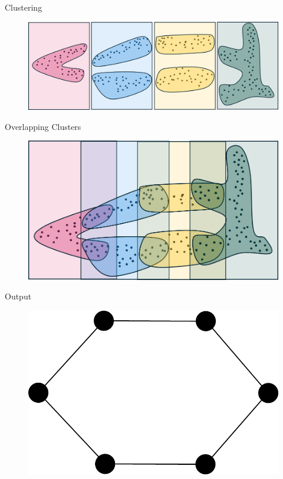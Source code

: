\documentclass{beamer}
\begin{document}
\begin{frame}{Clustering}
  \begin{figure}
    \begin{center}
      \includegraphics[width=1\textwidth]{posterdataclusters.png}
    \end{center}
  \end{figure}
\end{frame}

\begin{frame}{Overlapping Clusters}
  \begin{figure}
    \begin{center}
      \includegraphics[width=.8\textwidth]{intersectposterdata.png}
    \end{center}
  \end{figure}
\end{frame}

\begin{frame}{Output}
  \begin{figure}
    \begin{center}
      \includegraphics[width=.8\textwidth]{postermapper.png}
    \end{center}
  \end{figure}
\end{frame}
\end{document}
